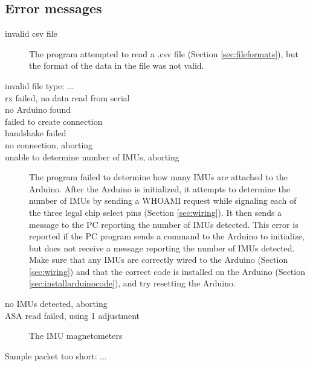 \documentclass[11pt,letterpaper,article,oneside]{memoir}
\begin{document}
\subsection{Error messages}

\begin{description}
\item[invalid csv file]
The program attempted to read a .csv file (Section \ref{sec:fileformats}), but
the format of the data in the file was not valid.

\item[invalid file type: ...]
\item[rx failed, no data read from serial]
\item[no Arduino found]
\item[failed to create connection]
\item[handshake failed]
\item[no connection, aborting]

\item[unable to determine number of IMUs, aborting]
The program failed to determine how many IMUs are attached to the Arduino. After
the Arduino is initialized, it attempts to determine the number of IMUs by
sending a WHOAMI request while signaling each of the three legal chip select
pins (Section \ref{sec:wiring}). It then sends a message to the PC reporting the
number of IMUs detected. This error is reported if the PC program sends a
command to the Arduino to initialize, but does not receive a message reporting
the number of IMUs detected. Make sure that any IMUs are correctly wired to the
Arduino (Section \ref{sec:wiring}) and that the correct code is installed on the
Arduino (Section \ref{sec:installarduinocode}), and try resetting the Arduino.

\item[no IMUs detected, aborting]

\item[ASA read failed, using 1 adjustment]
The IMU magnetometers 


\item[Sample packet too short: ...]


\end{description}







%
%
\end{document}
